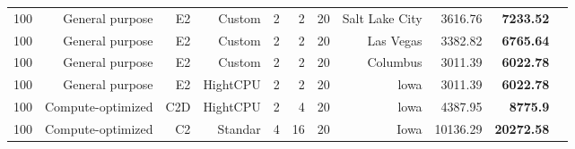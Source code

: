 \documentclass{article}
\begin{document}
\begin{adjustwidth}{-2.5 cm}{-2.5 cm}
\begin{threeparttable}[!htb]
\begin{tabular}{lrrrrrrrrrr}
\cellcolor[HTML]{ffd966}100 &\cellcolor[HTML]{ffd966}General purpose &\cellcolor[HTML]{ffd966}E2 &\cellcolor[HTML]{ffd966}Custom &\cellcolor[HTML]{ffd966}2 &\cellcolor[HTML]{ffd966}2 &\cellcolor[HTML]{ffd966}20 &\cellcolor[HTML]{ffd966}Salt Lake City &\cellcolor[HTML]{ffd966}3616.76 &\cellcolor[HTML]{ffd966}\textbf{7233.52} \\
\cellcolor[HTML]{ffd966}100 &\cellcolor[HTML]{ffd966}General purpose &\cellcolor[HTML]{ffd966}E2 &\cellcolor[HTML]{ffd966}Custom &\cellcolor[HTML]{ffd966}2 &\cellcolor[HTML]{ffd966}2 &\cellcolor[HTML]{ffd966}20 &\cellcolor[HTML]{ffd966}Las Vegas &\cellcolor[HTML]{ffd966}3382.82 &\cellcolor[HTML]{ffd966}\textbf{6765.64} \\
\cellcolor[HTML]{ffd966}100 &\cellcolor[HTML]{ffd966}General purpose &\cellcolor[HTML]{ffd966}E2 &\cellcolor[HTML]{ffd966}Custom &\cellcolor[HTML]{ffd966}2 &\cellcolor[HTML]{ffd966}2 &\cellcolor[HTML]{ffd966}20 &\cellcolor[HTML]{ffd966}Columbus &\cellcolor[HTML]{ffd966}3011.39 &\cellcolor[HTML]{ffff00}\textbf{6022.78} \\
\cellcolor[HTML]{ffff00}100 &\cellcolor[HTML]{ffff00}General purpose &\cellcolor[HTML]{ffff00}E2 &\cellcolor[HTML]{ffff00}HightCPU &\cellcolor[HTML]{ffff00}2 &\cellcolor[HTML]{ffff00}2 &\cellcolor[HTML]{ffff00}20 &\cellcolor[HTML]{ffff00}lowa &\cellcolor[HTML]{ffff00}3011.39 &\cellcolor[HTML]{ffff00}\textbf{6022.78} \\
\cellcolor[HTML]{ffd966}100 &\cellcolor[HTML]{ffd966}Compute-optimized &\cellcolor[HTML]{ffd966}C2D &\cellcolor[HTML]{ffd966}HightCPU &\cellcolor[HTML]{ffd966}2 &\cellcolor[HTML]{ffd966}4 &\cellcolor[HTML]{ffd966}20 &\cellcolor[HTML]{ffd966}lowa &\cellcolor[HTML]{ffd966}4387.95 &\cellcolor[HTML]{ffd966}\textbf{8775.9} \\
\cellcolor[HTML]{ffd966}100 &\cellcolor[HTML]{ffd966}Compute-optimized &\cellcolor[HTML]{ffd966}C2 &\cellcolor[HTML]{ffd966}Standar &\cellcolor[HTML]{ffd966}4 &\cellcolor[HTML]{ffd966}16 &\cellcolor[HTML]{ffd966}20 &\cellcolor[HTML]{ffd966}Iowa &\cellcolor[HTML]{ffd966}10136.29 &\cellcolor[HTML]{ffd966}\textbf{20272.58} \\
\bottomrule
\end{tabular}
\end{threeparttable}\end{adjustwidth}
\end{document}
